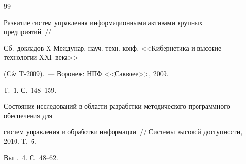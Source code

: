 {{\begin{thebibliography}{99}




Развитие систем управления информационными активами крупных предприятий~/\!\!/ 


Сб.\ докладов X Междунар. науч.-техн. конф. <<Кибернетика и высокие технологии XXI~века>>


 (C\& T-2009).~--- Воронеж: НПФ <<Саквоее>>, 2009. %


 Т.~1. С.~148--159.





\label{end\stat}









Состояние исследований в области разработки методического программного обеспечения для 


сис\-тем управления и обработки информации~/\!\!/ Системы высокой доступности, 2010. Т.~6. 


Вып.~4. С.~48--62.


 \end{thebibliography}


}


}


